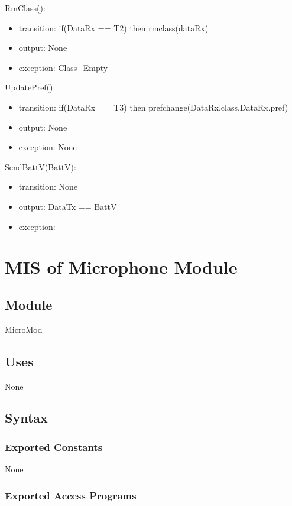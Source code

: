 \documentclass[12pt, titlepage]{article}
\begin{document}
\noindent RmClass():
\begin{itemize}
\item transition: if(DataRx == T2) then rmclass(dataRx)  
\item output: None 
\item exception: Class\_Empty 
\end{itemize}

\noindent UpdatePref():
\begin{itemize}
\item transition: if(DataRx == T3) then prefchange(DataRx.class,DataRx.pref)
\item output: None
\item exception: None 
\end{itemize}

\noindent SendBattV(BattV):
\begin{itemize}
\item transition: None 
\item output: DataTx == BattV 
\item exception:  
\end{itemize}

\newpage

\section{MIS of Microphone Module} \label{Microphone Module} 

\subsection{Module}

MicroMod

\subsection{Uses}

None

\subsection{Syntax}

\subsubsection{Exported Constants}

None 

\subsubsection{Exported Access Programs}
\end{document}
